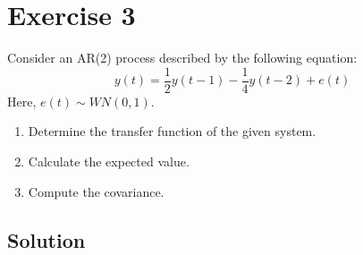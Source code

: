\section{Exercise 3}

Consider an AR(2) process described by the following equation:
\[y(t)=\dfrac{1}{2}y(t-1)-\dfrac{1}{4}y(t-2)+e(t)\]
Here, $e(t)\sim WN(0,1)$. 
\begin{enumerate}
    \item Determine the transfer function of the given system.
    \item Calculate the expected value.
    \item Compute the covariance.
\end{enumerate}

\subsection*{Solution}
